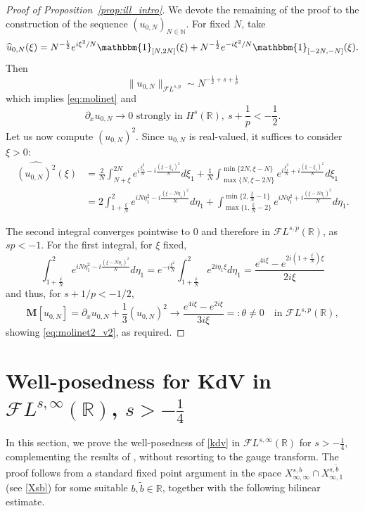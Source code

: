 \documentclass[%
11pt,  reqno]{amsart}
\newcommand{\5}{\textup{V}}
\newcommand{\noi}{\noindent}
\newcommand{\FL}{\mathcal{F} L}
\newcommand{\F}{\mathcal{F}}
\newcommand{\wt}{\widetilde}
\newcommand{\dx}{\partial_x}
\theoremstyle{remark}
\newcommand{\R}{\mathbb{R}}
\newcommand{\MMb}{\mathbf{M}}
\newcommand{\N}{\mathbb{N}}
\numberwithin{equation}{section}
\numberwithin{theorem}{section}
\begin{document}
\begin{proof}[Proof of Proposition~\ref{prop:ill_intro}]
We devote the remaining of the proof to the construction of the sequence $(u_{0,N})_{N\in\N}$. 
	For fixed $N$, take
	$$
	\widehat{u}_{0,N}(\xi)= N^{-\frac12} e^{i\xi^2/N}\mathbbm{1}_{[N, 2N]}(\xi) + N^{-\frac12} e^{-i\xi^2/N}\mathbbm{1}_{[-2N, -N]}(\xi).
	$$
	Then 
	$$
	\|u_{0,N}\|_{\mathcal{F}L^{s,p}} \sim N^{-\frac12 +s+ \frac1p}
	$$
	which implies \eqref{eq:molinet} and
	$$
	\dx u_{0,N} \to 0 \mbox{ strongly in }H^{s}(\R), \ s+\frac1p<-\frac12.
	$$
	Let us now compute $(u_{0,N})^2$. Since $u_{0,N}$ is real-valued, it suffices to consider $\xi>0$:
	\begin{align*}
		\widehat{(u_{0,N})^2}(\xi) &= \frac{2}{N}\int_{N+\xi}^{2N} e^{i\frac{\xi_1^2}{N}-i\frac{(\xi-\xi_1)^2}{N}}d\xi_1 + \frac{1}{N}\int_{\max\{N, \xi-2N\}}^{\min\{2N, \xi-N\}}  e^{i\frac{\xi_1^2}{N}+i\frac{(\xi-\xi_1)^2}{N}}d\xi_1\\&=2\int_{1+\frac\xi N}^{2} e^{iN\eta_1^2-i\frac{(\xi-N\eta_1)^2}{N}}d\eta_1 + \int_{\max\{1, \frac{\xi}{N}-2\}}^{\min\{2, \frac{\xi}{N}-1\}}  e^{iN\eta_1^2+i\frac{(\xi-N\eta_1)^2}{N}}d\eta_1
        .
	\end{align*}


    \noi
The second integral converges pointwise to $0$ and therefore in $\mathcal{F}L^{s,p}(\R)$, as $sp<-1$. For the first integral,  for $\xi$ fixed,
\begin{equation}
	\int_{1+\frac\xi N}^{2} e^{iN\eta_1^2-i\frac{(\xi-N\eta_1)^2}{N}}d\eta_1 = e^{-i\frac{\xi^2}{N}}\int_{1 + \frac{\xi}{N}}^{2} e^{2i\eta_1\xi}d\eta_1  = \frac{e^{4i\xi}-e^{2i\left(1+\frac{\xi}{N}\right)\xi}}{2i\xi}
\end{equation}
and thus, for $s+1/p<-1/2$,
\begin{equation}
	\MMb[u_{0,N}]= \dx u_{0,N} + \frac13 (u_{0,N})^2 \to \frac{e^{4i\xi}-e^{2i\xi}}{3i\xi} =: \theta \ne 0
    \quad \mbox{in }\mathcal{F}L^{s,p}(\R),
\end{equation}
showing \eqref{eq:molinet2_v2}, as required.
\end{proof}


\appendix


\section{Well-posedness for KdV in $\F L^{s,\infty}(\R)$, $s>-\frac14$}\label{sec:-14}

In this section, we prove the well-posedness of \eqref{kdv}
 in $\FL^{s, \infty}(\R)$ for $s>-\frac14$, complementing the results of \cite{Grunrock_ldv_hier}, without resorting to the gauge transform. 
The proof follows from a standard fixed point argument in the space $X^{s, b}_{\infty, \infty} \cap X^{s, \wt b }_{\infty, 1}$ (see \eqref{Xsb}) for some  suitable $b,\wt b\in \R$,
together with the following bilinear estimate. 
\end{document}
